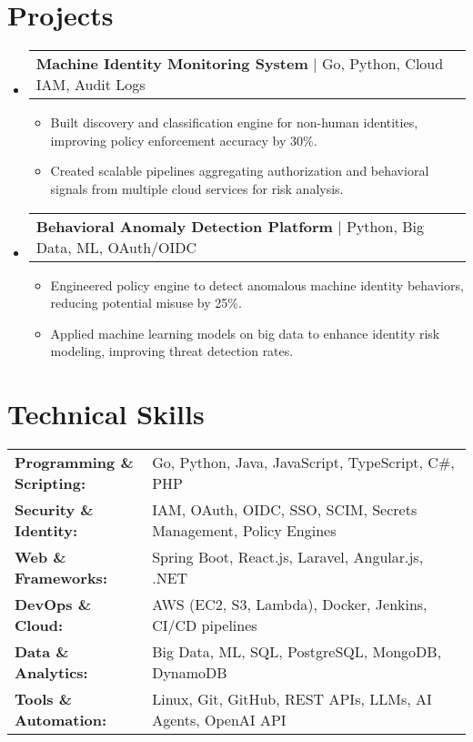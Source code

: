 \documentclass[letterpaper,11pt]{article}
\makeatletter
\newcommand{\resumeItem}[1]{
  \item\footnotesize{
    {#1 \vspace{-2pt}}
  }
}
\newcommand{\resumeProjectHeading}[2]{
    \item
    \begin{tabular*}{1.001\textwidth}{l@{\extracolsep{\fill}}r}
      \small#1 & \textbf{\small #2}\\
    \end{tabular*}\vspace{-7pt}
}
\newcommand{\resumeSubHeadingListStart}{\begin{itemize}[leftmargin=0pt, label={}]}
\newcommand{\resumeSubHeadingListEnd}{\end{itemize}}
\newcommand{\resumeItemListStart}{\begin{itemize}[leftmargin=*]}
\newcommand{\resumeItemListEnd}{\end{itemize}\vspace{-5pt}}
\makeatother
\begin{document}
\section{Projects}
    \vspace{-5pt}
    \resumeSubHeadingListStart
      \resumeProjectHeading
          {\textbf{Machine Identity Monitoring System} | Go, Python, Cloud IAM, Audit Logs}{}
          \resumeItemListStart
              \resumeItem{Built discovery and classification engine for non-human identities, improving policy enforcement accuracy by 30\%.}
              \resumeItem{Created scalable pipelines aggregating authorization and behavioral signals from multiple cloud services for risk analysis.}
          \resumeItemListEnd
          \vspace{-16pt}
      \resumeProjectHeading
          {\textbf{Behavioral Anomaly Detection Platform} | Python, Big Data, ML, OAuth/OIDC}{}
          \resumeItemListStart
              \resumeItem{Engineered policy engine to detect anomalous machine identity behaviors, reducing potential misuse by 25\%.}
              \resumeItem{Applied machine learning models on big data to enhance identity risk modeling, improving threat detection rates.}
          \resumeItemListEnd
          \vspace{-16pt}
    \resumeSubHeadingListEnd

\vspace{-10pt}
\section{Technical Skills}
        \vspace{-14pt}
        \begin{table}[h]
            \footnotesize
            \begin{tabular}{p{0.3\linewidth} p{0.7\linewidth}}
                \textbf{Programming \& Scripting:} & Go, Python, Java, JavaScript, TypeScript, C\#, PHP \\
                \textbf{Security \& Identity:} & IAM, OAuth, OIDC, SSO, SCIM, Secrets Management, Policy Engines \\
                \textbf{Web \& Frameworks:} & Spring Boot, React.js, Laravel, Angular.js, .NET \\
                \textbf{DevOps \& Cloud:} & AWS (EC2, S3, Lambda), Docker, Jenkins, CI/CD pipelines \\
                \textbf{Data \& Analytics:} & Big Data, ML, SQL, PostgreSQL, MongoDB, DynamoDB \\
                \textbf{Tools \& Automation:} & Linux, Git, GitHub, REST APIs, LLMs, AI Agents, OpenAI API \\
            \end{tabular}
        \end{table}
\end{document}

